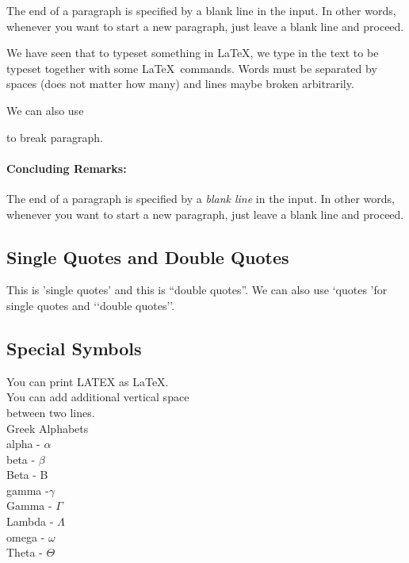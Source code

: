The end of a paragraph is specified by a blank line in the input.                                   In other words, whenever you want to start a new paragraph, just leave a blank line and proceed. 

\noindent We have seen that to typeset                                  something in \LaTeX, we type in                        the text to be typeset together with some \LaTeX\ commands.                                   Words must be separated by spaces (does not matter how many) and lines maybe broken arbitrarily. 

We can also use \par to break paragraph. 

\paragraph{Concluding Remarks:}
The end of a paragraph is specified by a \emph{blank line} in the input. In other words, whenever you want to start a new paragraph, just leave a blank line and proceed.

\subsection{Single Quotes and Double Quotes}

This is  'single quotes' and this is ``double quotes''. We can also use \lq quotes \rq for single quotes and \lq\lq double quotes\rq\rq .

\subsection{Special Symbols}

You can print LATEX as \LaTeX. \\
You can add additional vertical space \\ [2.0cm]
between two lines. \\

\noindent Greek Alphabets \\
alpha  -  $\alpha$ \\
beta   - $\beta$  \\
Beta   -   B  \\
gamma  -$\gamma$ \\
Gamma  - $\Gamma$ \\
Lambda - $\Lambda$ \\
omega  - $\omega$ \\
Theta  - $\Theta$ \\


